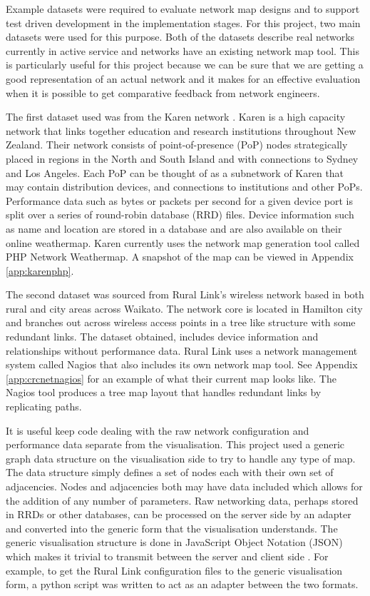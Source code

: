 \documentclass[11pt, a4paper]{article}
\begin{document}
Example datasets were required to evaluate network map designs and to support
test driven development in the implementation stages. For this project, two main
datasets were used for this purpose. Both of the datasets describe real networks
currently in active service and networks have an existing network map tool.
This is particularly useful for this project because we can be sure that we are
getting a good representation of an actual network and it makes for an effective
evaluation when it is possible to get comparative feedback from network
engineers. 

The first dataset used was from the Karen network \cite{Karen_website}. Karen is
a high capacity network that links together education and research institutions
throughout New Zealand. Their network consists of point-of-presence (PoP) nodes
strategically placed in regions in the North and South Island and with
connections to Sydney and Los Angeles. Each PoP can be thought of as a
subnetwork of Karen that may contain distribution devices, and connections to
institutions and other PoPs.  Performance data such as bytes or packets per
second for a given device port is split over a series of round-robin database
(RRD) files. Device information such as name and location are stored in a
database and are also available on their online weathermap. Karen currently uses
the network map generation tool called PHP Network Weathermap. A snapshot of the
map can be viewed in Appendix \ref{app:karenphp}.


The second dataset was sourced from Rural Link's wireless network based in both
rural and city areas across Waikato. The network core is located in Hamilton
city and branches out across wireless access points in a tree like structure
with some redundant links. The dataset obtained, includes device information and
relationships without performance data. Rural Link uses a network management
system called Nagios that also includes its own network map tool. See Appendix
\ref{app:crcnetnagios} for an example of what their current map looks like. The
Nagios tool produces a tree map layout that handles redundant links by
replicating paths.


It is useful keep code dealing with the raw network configuration and
performance data separate from the visualisation. This project used a generic
graph data structure on the visualisation side to try to handle any type of map.
The data structure simply defines a set of nodes each with their own set of
adjacencies. Nodes and adjacencies both may have data included which allows for
the addition of any number of parameters. Raw networking data, perhaps stored in
RRDs or other databases, can be processed on the server side by an adapter and
converted into the generic form that the visualisation understands.  The generic
visualisation structure is done in JavaScript Object Notation (JSON) which makes
it trivial to transmit between the server and client side \cite{rfc4627}. For
example, to get the Rural Link configuration files to the generic visualisation
form, a python script was written to act as an adapter between the two formats. 
\end{document}
